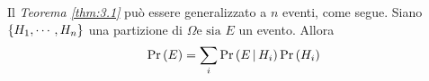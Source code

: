 \documentclass{subfiles}
\begin{document}
Il \emph{Teorema \ref{thm:3.1}} può essere generalizzato a \(n\) eventi, come segue.
Siano \(\Set{H_{1}, \cdots, H_{n}}\) una partizione di \(\Omega \text{e sia } E\) un evento.
Allora
\[
    \Prob{E} = \Sum{\Prob{E}[H_{i}] \Prob{H_{i}}}{i}
\]
\end{document}
